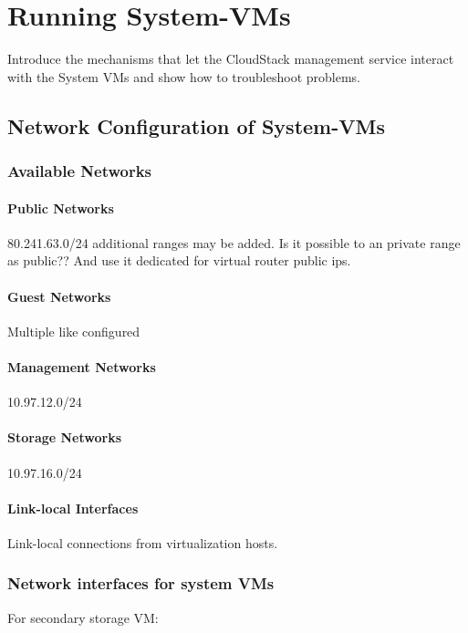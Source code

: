 \section{Running System-VMs} 
Introduce the mechanisms that let the CloudStack management service interact with the System VMs and show how to troubleshoot problems.

\subsection{Network Configuration of System-VMs} 

\subsubsection{Available Networks}

\paragraph {Public Networks}
80.241.63.0/24
additional ranges may be added. Is it possible to an private range as public?? And use it dedicated for virtual router public ips.

\paragraph {Guest Networks}
Multiple like configured

\paragraph {Management Networks}
10.97.12.0/24

\paragraph {Storage Networks}
10.97.16.0/24


\paragraph {Link-local Interfaces}
Link-local connections from virtualization hosts.

\subsubsection{Network interfaces for system VMs}

For secondary storage VM:

